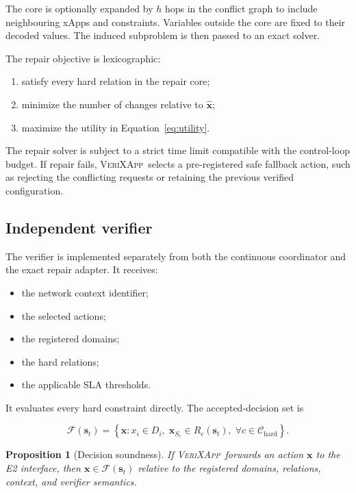 \documentclass[pdflatex,sn-mathphys-num,iicol,oneside]{sn-jnl}
\newcommand{\method}{\textsc{VeriXApp}}
\newtheorem{proposition}{Proposition}
\begin{document}
The core is optionally expanded by $h$ hops in the conflict graph to
include neighbouring xApps and constraints. Variables outside the
core are fixed to their decoded values. The induced subproblem is
then passed to an exact solver.

The repair objective is lexicographic:

\begin{enumerate}
    \item satisfy every hard relation in the repair core;
    \item minimize the number of changes relative to
    $\widehat{\bm{x}}$;
    \item maximize the utility in
    Equation~\eqref{eq:utility}.
\end{enumerate}

The repair solver is subject to a strict time limit compatible with
the control-loop budget. If repair fails, \method\ selects a
pre-registered safe fallback action, such as rejecting the conflicting
requests or retaining the previous verified configuration.

\subsection{Independent verifier}

The verifier is implemented separately from both the continuous
coordinator and the exact repair adapter. It receives:

\begin{itemize}
    \item the network context identifier;
    \item the selected actions;
    \item the registered domains;
    \item the hard relations;
    \item the applicable SLA thresholds.
\end{itemize}

It evaluates every hard constraint directly. The accepted-decision
set is

\begin{equation}
\mathcal{F}(\bm{s}_t)
=
\left\{
\bm{x}:
x_i\in D_i,
\;
\bm{x}_{S_c}\in R_c(\bm{s}_t),
\;
\forall c\in\mathcal{C}_{\mathrm{hard}}
\right\}.
\end{equation}

\begin{proposition}[Decision soundness]
\label{prop:soundness}
If \method\ forwards an action $\bm{x}$ to the E2 interface, then
$\bm{x}\in\mathcal{F}(\bm{s}_t)$ relative to the registered domains,
relations, context, and verifier semantics.
\end{proposition}
\end{document}
